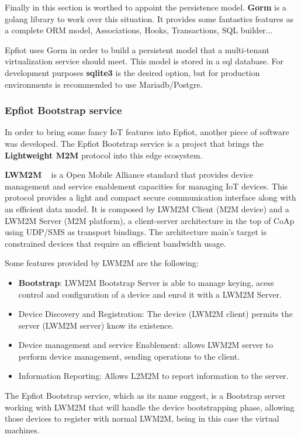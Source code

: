 Finally in this section is worthed to appoint the persistence model.
\textbf{Gorm} is a golang library to work over this situation. It provides some fantastics features as a complete ORM model, Associations, Hooks, Transactions, SQL builder...

Epfiot uses Gorm in order to build a persistent model that a multi-tenant virtualization service should meet. This model is stored in a sql database. For development purposes \textbf{sqlite3} is the desired option, but for production environments is recommended to use Mariadb/Postgre.

\subsubsection{Epfiot Bootstrap service}

In order to bring some fancy IoT features into Epfiot, another piece of software was developed. The Epfiot Bootstrap service is a project that brings the \textbf{Lightweight M2M} protocol into this edge ecosystem.

\textbf{LWM2M} ~\cite{lwm2m_paper} is a Open Mobile Alliance standard that provides device management and service enablement capacities for managing IoT devices.
This protocol provides a light and compact secure communication interface along with an efficient data model. It is composed by LWM2M Client (M2M device) and a LWM2M Server (M2M platform), a client-server architecture in the top of CoAp using UDP/SMS as transport bindings. The architecture main's target is constrained devices that require an efficient bandwidth usage. ~\cite{IEE:lwm2m:2015}

Some features provided by LWM2M are the following:
\begin{itemize}
\item \textbf{Bootstrap}: LWM2M Bootstrap Server is able to manage keying, acess control and configuration of a device and enrol it with a LWM2M Server.
\item Device Discovery and Registration: The device (LWM2M client) permits the server (LWM2M server) know its existence.
\item Device management and service Enablement: allows LWM2M server to perform device management, sending operations to the client.
\item Information Reporting: Allows L2M2M to report information to the server.
\end{itemize}

The Epfiot Bootstrap service, which as its name suggest, is a Bootstrap server working with LWM2M that will handle the device bootstrapping phase, allowing those devices to register with normal LWM2M, being in this case the virtual machines.

